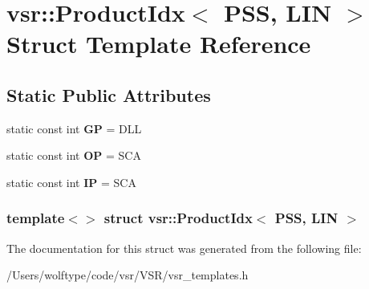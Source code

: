\hypertarget{structvsr_1_1_product_idx_3_01_p_s_s_00_01_l_i_n_01_4}{\section{vsr\-:\-:Product\-Idx$<$ P\-S\-S, L\-I\-N $>$ Struct Template Reference}
\label{structvsr_1_1_product_idx_3_01_p_s_s_00_01_l_i_n_01_4}
}
\subsection*{Static Public Attributes}
\begin{DoxyCompactItemize}
\item 
\hypertarget{structvsr_1_1_product_idx_3_01_p_s_s_00_01_l_i_n_01_4_a420d56b5e3c1e044cbee1aa6055a1fd1}{static const int {\bfseries G\-P} = D\-L\-L}\label{structvsr_1_1_product_idx_3_01_p_s_s_00_01_l_i_n_01_4_a420d56b5e3c1e044cbee1aa6055a1fd1}

\item 
\hypertarget{structvsr_1_1_product_idx_3_01_p_s_s_00_01_l_i_n_01_4_aae3ba138c93d30e2af6f9a1ed65b3510}{static const int {\bfseries O\-P} = S\-C\-A}\label{structvsr_1_1_product_idx_3_01_p_s_s_00_01_l_i_n_01_4_aae3ba138c93d30e2af6f9a1ed65b3510}

\item 
\hypertarget{structvsr_1_1_product_idx_3_01_p_s_s_00_01_l_i_n_01_4_a15b315449d74fc79bbf77e6ffbaffdc4}{static const int {\bfseries I\-P} = S\-C\-A}\label{structvsr_1_1_product_idx_3_01_p_s_s_00_01_l_i_n_01_4_a15b315449d74fc79bbf77e6ffbaffdc4}

\end{DoxyCompactItemize}
\subsubsection*{template$<$$>$ struct vsr\-::\-Product\-Idx$<$ P\-S\-S, L\-I\-N $>$}



The documentation for this struct was generated from the following file\-:\begin{DoxyCompactItemize}
\item 
/\-Users/wolftype/code/vsr/\-V\-S\-R/vsr\-\_\-templates.\-h\end{DoxyCompactItemize}
